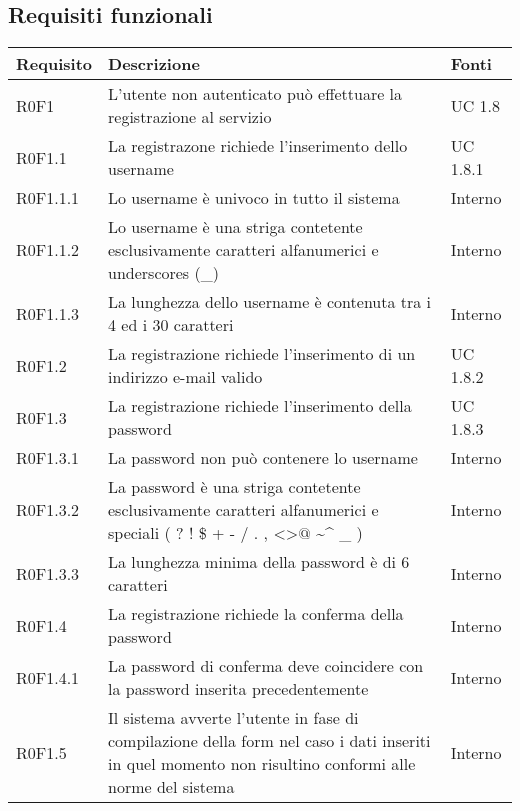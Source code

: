 \subsection{Requisiti funzionali}

\begin{center}

	\def\arraystretch{1.5}
	\bgroup
	\begin{longtable}{| p{2cm} | p{8cm} | p{2cm} |}

		\hline
		\textbf{Requisito} & \textbf{Descrizione} & \textbf{Fonti} \\
		\hline

		R0F1  &  L'utente non autenticato può effettuare la registrazione al servizio  &  UC 1.8 \\
		\hline
		R0F1.1  &  La registrazone richiede l'inserimento dello username  &  UC 1.8.1 \\
		\hline
		R0F1.1.1  &  Lo username è univoco in tutto il sistema  &  Interno \\
		\hline
		R0F1.1.2  &  Lo username è una striga contetente esclusivamente caratteri alfanumerici e underscores (\_)  &  Interno \\
		\hline
		R0F1.1.3  &  La lunghezza dello username è contenuta tra i 4 ed i 30 caratteri  &  Interno \\
		\hline
		R0F1.2  &  La registrazione richiede l'inserimento di un indirizzo e-mail valido &  UC 1.8.2 \\
		\hline
		R0F1.3  &  La registrazione richiede l'inserimento della password  &  UC 1.8.3 \\
		\hline
		R0F1.3.1  &  La password non può contenere lo username  &  Interno \\
		\hline
		R0F1.3.2  &  La password è una striga contetente esclusivamente caratteri alfanumerici e speciali ( ? ! \$ + - / . , \textless \textgreater $@$ \textasciitilde \^{} \_ )  &  Interno \\
		\hline
		R0F1.3.3  &  La lunghezza minima della password è di 6 caratteri  &  Interno \\
		\hline
		R0F1.4  &  La registrazione richiede la conferma della password  &  Interno \\
		\hline
		R0F1.4.1  &  La password di conferma deve coincidere con la password inserita precedentemente  &  Interno \\
		\hline
		R0F1.5  &  Il sistema avverte l'utente in fase di compilazione della form nel caso i dati inseriti in quel momento non risultino conformi alle norme del sistema  &  Interno \\

\end{longtable}
\end{center}
